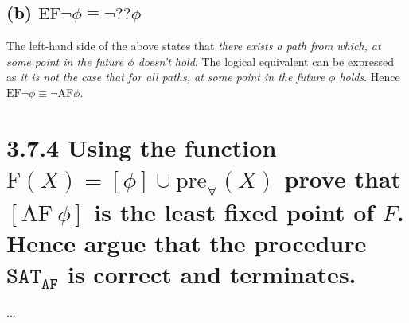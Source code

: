 \documentclass[11pt,a4paper]{article}
\begin{document}
\subsection*{(b) \mdseries $\text{EF} \neg\phi \equiv \neg ?? \phi$}
The left-hand side of the above states that {\it there exists a path from
which, at some point in the future $\phi$ doesn't hold}. The logical
equivalent can be expressed as {\it it is not the case that for all paths,
at some point in the future $\phi$ holds}. Hence $\text{EF} \neg\phi \equiv
\neg \text{AF} \phi$.

\section*{3.7.4 \mdseries Using the function $\text{F}(X)=[\phi] \cup
\text{pre}_\forall(X)$ prove that $[\text{AF}{\ }\phi]$ is the least fixed
point of $F$. Hence argue that the procedure $\texttt{SAT}_{\texttt{AF}}$ is
correct and terminates.}
...

\end{document}
